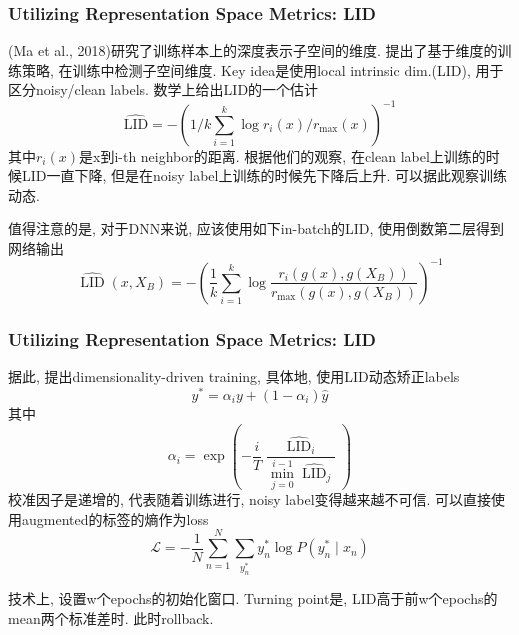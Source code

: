 \documentclass{beamer}
\begin{document}
\begin{frame}
    \frametitle{Utilizing Representation Space Metrics: LID}

    (Ma et al., 2018)研究了训练样本上的深度表示子空间的维度. 提出了基于维度的训练策略, 在训练中检测子空间维度. Key idea是使用local intrinsic dim.(LID), 用于区分noisy/clean labels. 数学上给出LID的一个估计
    \begin{equation}
        \widehat{\mathrm{LID}}=-\left(1 / k \sum_{i=1}^{k} \log r_{i}(x) / r_{\max }(x)\right)^{-1}
    \end{equation}
    其中$r_i(x)$是x到i-th neighbor的距离. 根据他们的观察, 在clean label上训练的时候LID一直下降, 但是在noisy label上训练的时候先下降后上升. 可以据此观察训练动态.

    值得注意的是, 对于DNN来说, 应该使用如下in-batch的LID, 使用倒数第二层得到网络输出
    \begin{equation}
        \widehat{\operatorname{LID}}\left(x, X_{B}\right)=-\left(\frac{1}{k} \sum_{i=1}^{k} \log \frac{r_{i}\left(g(x), g\left(X_{B}\right)\right)}{r_{\max }\left(g(x), g\left(X_{B}\right)\right)}\right)^{-1}
    \end{equation}

\end{frame}

\begin{frame}
    \frametitle{Utilizing Representation Space Metrics: LID}

    据此, 提出dimensionality-driven training, 具体地, 使用LID动态矫正labels
    \begin{equation}
        y^{*}=\alpha_{i} y+\left(1-\alpha_{i}\right) \widehat{y}
    \end{equation}
    其中
    \begin{equation}
        \alpha_{i}=\exp \left(-\frac{i}{T} \frac{\widehat{\operatorname{LID}}_{i}}{\min _{j=0}^{i-1} \widehat{\operatorname{LID}}_{j}}\right)
    \end{equation}
    校准因子是递增的, 代表随着训练进行, noisy label变得越来越不可信. 可以直接使用augmented的标签的熵作为loss
    \begin{equation}
        \mathcal{L}=-\frac{1}{N} \sum_{n=1}^{N} \sum_{y_{n}^{*}} y_{n}^{*} \log P\left(y_{n}^{*} \mid x_{n}\right)
    \end{equation}

    技术上, 设置w个epochs的初始化窗口. Turning point是, LID高于前w个epochs的mean两个标准差时. 此时rollback.

\end{frame}
\end{document}
